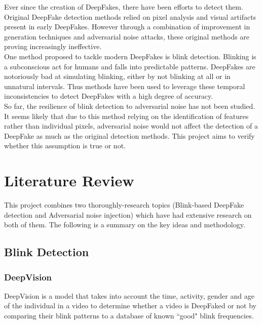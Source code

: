 \documentclass{article}
\begin{document}
Ever since the creation of DeepFakes, there have been efforts to detect them. Original DeepFake detection methods relied on pixel analysis and visual artifacts present in early DeepFakes\cite{yu2021survey}. However through a combination of improvement in generation techniques and adversarial noise attacks\cite{huang2020fakeretouch}\cite{pertubations}, these original methods are proving increasingly ineffective.\\

One method proposed to tackle modern DeepFakes is blink detection. Blinking is a subconscious act for humans and falls into predictable patterns. DeepFakes are notoriously bad at simulating blinking, either by not blinking at all or in unnatural intervals. Thus methods have been used to leverage these temporal inconsistencies to detect DeepFakes with a high degree of accuracy\cite{blinking-pattern}.\\

So far, the resilience of blink detection to adversarial noise has not been studied. It seems likely that due to this method relying on the identification of features rather than individual pixels, adversarial noise would not affect the detection of a DeepFake as much as the original detection methods. This project aims to verify whether this assumption is true or not.

\section{Literature Review} \label{sec:literature-review}

This project combines two thoroughly-research topics (Blink-based DeepFake detection and Adversarial noise injection) which have had extensive research on both of them. The following is a summary on the key ideas and methodology.

\subsection{Blink Detection}
\subsubsection{DeepVision}

DeepVision\cite{blinking-pattern} is a model that takes into account the time, activity, gender and age of the individual in a video to determine whether a video is DeepFaked or not by comparing their blink patterns to a database of known ``good" blink frequencies.\\
\end{document}
